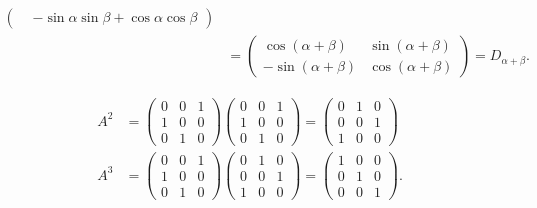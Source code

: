 \begin{loesung}
\begin{teilaufgaben}
\begin{align*}
\begin{pmatrix}
	&-\sin\alpha\sin\beta+\cos\alpha\cos\beta
\end{pmatrix}
\\
&=
\begin{pmatrix}
 \cos(\alpha+\beta)&\sin(\alpha+\beta)\\
-\sin(\alpha+\beta)&\cos(\alpha+\beta)
\end{pmatrix}=D_{\alpha+\beta}.
\end{align*}
\item
\begin{align*}
A^2
&=
\begin{pmatrix}0&0&1\\1&0&0\\0&1&0\end{pmatrix}
\begin{pmatrix}0&0&1\\1&0&0\\0&1&0\end{pmatrix}
=
\begin{pmatrix} 0&1&0\\ 0&0&1\\ 1&0&0\end{pmatrix}
\\
A^3&=
\begin{pmatrix}0&0&1\\1&0&0\\0&1&0\end{pmatrix}
\begin{pmatrix} 0&1&0\\ 0&0&1\\ 1&0&0\end{pmatrix}
=
\begin{pmatrix}
1&0&0\\0&1&0\\0&0&1
\end{pmatrix}.
\end{align*}
\end{teilaufgaben}
\end{loesung}
